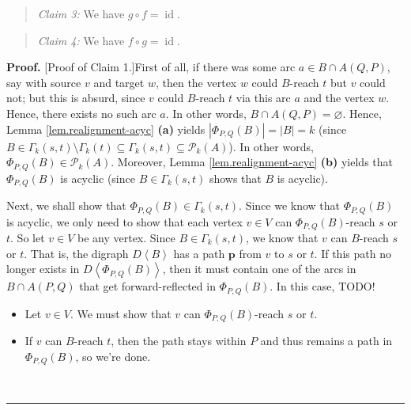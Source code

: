 \documentclass[numbers=enddot,12pt,final,onecolumn,notitlepage]{scrartcl}%
\theoremstyle{definition}
\newenvironment{statement}{\begin{quote}}{\end{quote}}
\newenvironment{proof}[1][Proof]{\noindent\textbf{#1.} }{\ \rule{0.5em}{0.5em}}
\theoremstyle{plainsl}
\begin{document}
\begin{statement}
\textit{Claim 3:} We have $g\circ f=\operatorname*{id}$.
\end{statement}

\begin{statement}
\textit{Claim 4:} We have $f\circ g=\operatorname*{id}$.
\end{statement}

\begin{proof}
[Proof of Claim 1.]First of all, if there was some arc $a\in B\cap A\left(
Q,P\right)  $, say with source $v$ and target $w$, then the vertex $w$ could
$B$-reach $t$ but $v$ could not; but this is absurd, since $v$ could $B$-reach
$t$ via this arc $a$ and the vertex $w$. Hence, there exists no such arc $a$.
In other words, $B\cap A\left(  Q,P\right)  =\varnothing$. Hence, Lemma
\ref{lem.realignment-acyc} \textbf{(a)} yields $\left\vert \Phi_{P,Q}\left(
B\right)  \right\vert =\left\vert B\right\vert =k$ (since $B\in\Gamma
_{k}\left(  s,t\right)  \setminus\Gamma_{k}\left(  t\right)  \subseteq
\Gamma_{k}\left(  s,t\right)  \subseteq\mathcal{P}_{k}\left(  A\right)  $). In
other words, $\Phi_{P,Q}\left(  B\right)  \in\mathcal{P}_{k}\left(  A\right)
$. Moreover, Lemma \ref{lem.realignment-acyc} \textbf{(b)} yields that
$\Phi_{P,Q}\left(  B\right)  $ is acyclic (since $B\in\Gamma_{k}\left(
s,t\right)  $ shows that $B$ is acyclic).

Next, we shall show that $\Phi_{P,Q}\left(  B\right)  \in\Gamma_{k}\left(
s,t\right)  $. Since we know that $\Phi_{P,Q}\left(  B\right)  $ is acyclic,
we only need to show that each vertex $v\in V$ can $\Phi_{P,Q}\left(
B\right)  $-reach $s$ or $t$. So let $v\in V$ be any vertex. Since $B\in
\Gamma_{k}\left(  s,t\right)  $, we know that $v$ can $B$-reach $s$ or $t$.
That is, the digraph $D\left\langle B\right\rangle $ has a path $\mathbf{p}$
from $v$ to $s$ or $t$. If this path no longer exists in $D\left\langle
\Phi_{P,Q}\left(  B\right)  \right\rangle $, then it must contain one of the
arcs in $B\cap A\left(  P,Q\right)  $ that get forward-reflected in
$\Phi_{P,Q}\left(  B\right)  $. In this case, TODO!

\begin{itemize}
\item Let $v\in V$. We must show that $v$ can $\Phi_{P,Q}\left(  B\right)
$-reach $s$ or $t$.

\item If $v$ can $B$-reach $t$, then the path stays within $P$ and thus
remains a path in $\Phi_{P,Q}\left(  B\right)  $, so we're done.


\end{itemize}
\end{proof}
\end{document}

